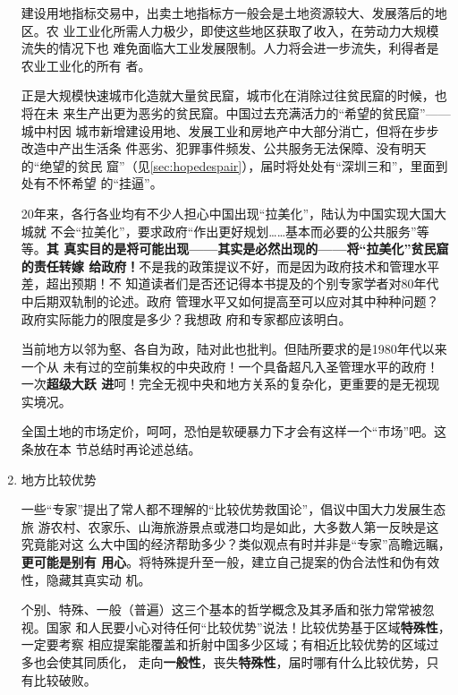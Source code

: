 \begin{enumerate}
  建设用地指标交易中，出卖土地指标方一般会是土地资源较大、发展落后的地区。农
  业工业化所需人力极少，即使这些地区获取了收入，在劳动力大规模流失的情况下也
  难免面临大工业发展限制。人力将会进一步流失，利得者是农业工业化的所有
  者。

  正是大规模快速城市化造就大量贫民窟，城市化在消除过往贫民窟的时候，也将在未
  来生产出更为恶劣的贫民窟。中国过去充满活力的“希望的贫民窟”——城中村因
  城市新增建设用地、发展工业和房地产中大部分消亡，但将在步步改造中产出生活条
  件恶劣、犯罪事件频发、公共服务无法保障、没有明天的“绝望的贫民
  窟”（见\cref{sec:hopedespair}），届时将处处有“深圳三和”，里面到处有不怀希望
  的“挂逼”。

  20年来，各行各业均有不少人担心中国出现“拉美化”，陆认为中国实现大国大城就
  不会“拉美化”，要求政府“作出更好规划……基本而必要的公共服务”等等。\textbf{其
    真实目的是将可能出现——其实是必然出现的——将“拉美化”贫民窟的责任转嫁
    给政府！}不是我的政策提议不好，而是因为政府技术和管理水平差，超出预期！不
  知道读者们是否还记得本书提及的个别专家学者对80年代中后期双轨制的论述。政府
  管理水平又如何提高至可以应对其中种种问题？政府实际能力的限度是多少？我想政
  府和专家都应该明白。

  当前地方以邻为壑、各自为政，陆对此也批判。但陆所要求的是1980年代以来一个从
  未有过的空前集权的中央政府！一个具备超凡入圣管理水平的政府！一次\textbf{超级大跃
    进}呵！完全无视中央和地方关系的复杂化，更重要的是无视现实境况。

  全国土地的市场定价，呵呵，恐怕是软硬暴力下才会有这样一个“市场”吧。这条放在本
  节总结时再论述总结。


\item 地方比较优势

  一些“专家”提出了常人都不理解的“比较优势救国论”，倡议中国大力发展生态旅
  游农村、农家乐、山海旅游景点或港口均是如此，大多数人第一反映是这究竟能对这
  么大中国的经济帮助多少？类似观点有时并非是“专家”高瞻远瞩，\textbf{更可能是别有
    用心}。将特殊提升至一般，建立自己提案的伪合法性和伪有效性，隐藏其真实动
  机。

  个别、特殊、一般（普遍）这三个基本的哲学概念及其矛盾和张力常常被忽视。国家
  和人民要小心对待任何“比较优势”说法！比较优势基于区域\textbf{特殊性}，一定要考察
  相应提案能覆盖和折射中国多少区域；有相近比较优势的区域过多也会使其同质化，
  走向\textbf{一般性}，丧失\textbf{特殊性}，届时哪有什么比较优势，只有比较破败。

\end{enumerate}

